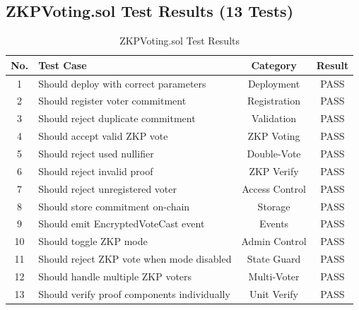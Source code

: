 \documentclass[oneside,a4paper,12pt]{book}
\begin{document}
\subsection{ZKPVoting.sol Test Results (13 Tests)}

\begin{table}[htbp]
\centering
\renewcommand{\arraystretch}{1.15}
\small
\begin{tabularx}{\textwidth}{|c|X|c|c|}
\hline
\textbf{No.} & \textbf{Test Case} & \textbf{Category} & \textbf{Result} \\
\hline
1 & Should deploy with correct parameters & Deployment & \textcolor{green!60!black}{PASS} \\
\hline
2 & Should register voter commitment & Registration & \textcolor{green!60!black}{PASS} \\
\hline
3 & Should reject duplicate commitment & Validation & \textcolor{green!60!black}{PASS} \\
\hline
4 & Should accept valid ZKP vote & ZKP Voting & \textcolor{green!60!black}{PASS} \\
\hline
5 & Should reject used nullifier & Double-Vote & \textcolor{green!60!black}{PASS} \\
\hline
6 & Should reject invalid proof & ZKP Verify & \textcolor{green!60!black}{PASS} \\
\hline
7 & Should reject unregistered voter & Access Control & \textcolor{green!60!black}{PASS} \\
\hline
8 & Should store commitment on-chain & Storage & \textcolor{green!60!black}{PASS} \\
\hline
9 & Should emit EncryptedVoteCast event & Events & \textcolor{green!60!black}{PASS} \\
\hline
10 & Should toggle ZKP mode & Admin Control & \textcolor{green!60!black}{PASS} \\
\hline
11 & Should reject ZKP vote when mode disabled & State Guard & \textcolor{green!60!black}{PASS} \\
\hline
12 & Should handle multiple ZKP voters & Multi-Voter & \textcolor{green!60!black}{PASS} \\
\hline
13 & Should verify proof components individually & Unit Verify & \textcolor{green!60!black}{PASS} \\
\hline
\end{tabularx}
\caption{ZKPVoting.sol Test Results}
\label{tab:test_zkp}
\end{table}
\end{document}
